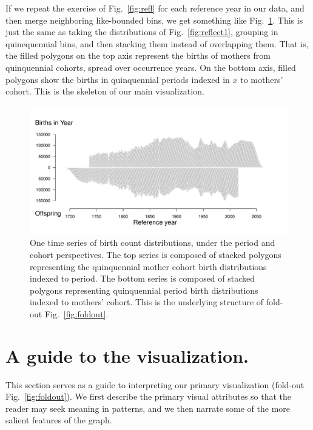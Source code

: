\documentclass{article}
\begin{document}
If we repeat the exercise of Fig.~\ref{fig:refl} for each reference year in our data, and then merge neighboring like-bounded bins, we get something like Fig.~\ref{fig:joinbins}. This is just the same as taking the distributions of Fig.~\ref{fig:reflect1}, grouping in quinequennial bins, and then stacking them instead of overlapping them. That is, the filled polygons on the top axis represent the births of mothers from quinquennial cohorts, spread over occurrence years. On the bottom axis, filled polygons show the births in quinquennial periods indexed in $x$ to mothers' cohort. This is the skeleton of our main visualization.

\begin{figure}[ht!]
 \centering
        \includegraphics[width=\textwidth]{Figures/JoinBins.pdf}
        \caption{One time series of birth count distributions, under the period and cohort perspectives. The top series is composed of stacked polygons representing the quinquennial mother cohort birth distributions indexed to period. The bottom series is composed of stacked polygons representing quinquennial period birth distributions indexed to mothers' cohort. This is the underlying structure of fold-out Fig.~\ref{fig:foldout}.}
          \label{fig:joinbins}
\end{figure}

\section{A guide to the visualization.}
\label{sec:description}
This section serves as a guide to interpreting our primary visualization (fold-out Fig.~\ref{fig:foldout}). We first describe the primary visual attributes so that the reader may seek meaning in patterns, and we then narrate some of the more salient features of the graph.
\end{document}
